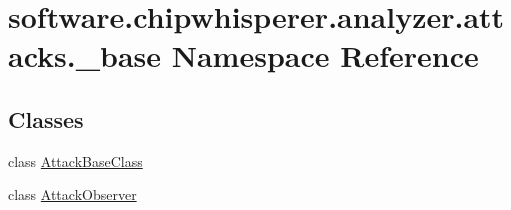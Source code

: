 \hypertarget{namespacesoftware_1_1chipwhisperer_1_1analyzer_1_1attacks_1_1__base}{}\section{software.\+chipwhisperer.\+analyzer.\+attacks.\+\_\+base Namespace Reference}
\label{namespacesoftware_1_1chipwhisperer_1_1analyzer_1_1attacks_1_1__base}
\subsection*{Classes}
\begin{DoxyCompactItemize}
\item 
class \hyperlink{classsoftware_1_1chipwhisperer_1_1analyzer_1_1attacks_1_1__base_1_1AttackBaseClass}{Attack\+Base\+Class}
\item 
class \hyperlink{classsoftware_1_1chipwhisperer_1_1analyzer_1_1attacks_1_1__base_1_1AttackObserver}{Attack\+Observer}
\end{DoxyCompactItemize}
